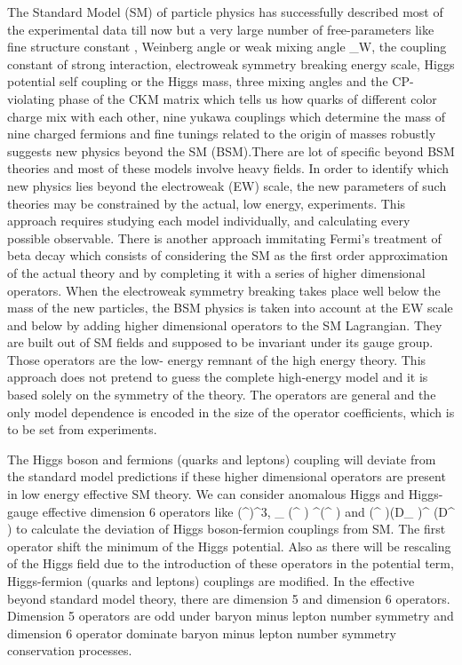 \documentclass[final,3p]{CSP}
\begin{document}
The Standard Model (SM) of particle physics has successfully described most of the experimental data till now but a very large number of
free-parameters like fine structure constant \alpha, Weinberg angle or weak mixing angle \theta_W, the coupling constant of strong 
interaction, electroweak symmetry breaking energy scale, Higgs potential self coupling or the Higgs mass, three mixing angles and the 
CP-violating phase of the CKM matrix which tells us how quarks of different color charge mix with each other, nine yukawa couplings 
which determine the mass of nine charged fermions and fine tunings related to the origin of masses robustly suggests new physics beyond 
the SM (BSM).There are lot of specific beyond BSM theories and most of these models involve heavy fields. In order to identify which new 
physics lies beyond the electroweak (EW) scale, the new parameters of such theories may be constrained by the actual, low energy, 
experiments. This approach requires studying each model individually, and calculating every possible observable. There is another 
approach immitating Fermi’s treatment of beta decay which consists of considering the SM as the first order approximation of the actual 
theory and by completing it with a series of higher dimensional operators. When the electroweak symmetry breaking takes place well below 
the mass of the new particles, the BSM physics is taken into account at the EW scale and below by adding higher dimensional operators to 
the SM Lagrangian. They are built out of SM fields and supposed to be invariant under its gauge group. Those operators are the low-
energy remnant of the high energy theory. This approach does not pretend to guess the complete high-energy model and it is based solely 
on the symmetry of the  theory. The operators are general and the only model dependence is encoded in the size of the operator 
coefficients, which is to be set from experiments. 

The Higgs boson and fermions (quarks and leptons) coupling will deviate from the standard model predictions if these higher dimensional 
operators are present in low energy effective SM theory. We can consider anomalous Higgs and Higgs-gauge effective dimension 6 operators 
like (\phi^{\dagger}\phi)^3,  \partial_{\mu} (\phi^{\dagger} \phi) \partial^{\mu}(\phi^{\dagger} \phi) and 
(\phi^{\dagger} \phi)(D_{\mu} \phi)^{\dagger} (D^{\mu} \phi) to calculate the deviation of Higgs boson-fermion couplings from SM. The 
first operator shift the minimum of the Higgs potential. Also as there will be rescaling of the Higgs field due to the introduction of 
these operators in the potential term, Higgs-fermion (quarks and leptons) couplings are modified. In the effective beyond standard model 
theory, there are dimension 5 and dimension 6 operators. Dimension 5 operators are odd under baryon minus lepton number symmetry and 
dimension 6 operator dominate baryon minus lepton number symmetry conservation processes. 
\end{document}
